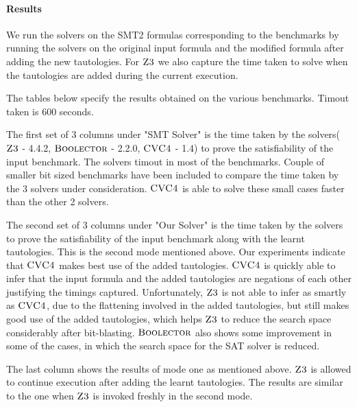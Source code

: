 \paragraph{\bf Results}
%
We run the solvers on the SMT2 formulas corresponding to the benchmarks by running the solvers on the original input formula and the modified formula after adding the new tautologies.
%
For $\textsc{Z3}$ we also capture the time taken to solve when the tautologies are added during the current execution.

The tables below specify the results obtained on the various benchmarks. Timout taken is 600 seconds.
%



The first set of 3 columns under "SMT Solver" is the time taken by the solvers($\textsc{Z3}$ - 4.4.2, $\textsc{Boolector}$ - 2.2.0, $\textsc{CVC4}$ - 1.4) to prove the satisfiability of the input benchmark. The solvers timout in most of the benchmarks. Couple of smaller bit sized benchmarks have been included to compare the time taken by the 3 solvers under consideration. $\textsc{CVC4}$ is able to solve these small cases faster than the other 2 solvers.

The second set of 3 columns under "Our Solver" is the time taken by the solvers to prove the satisfiability of the input benchmark along with the learnt tautologies. This is the second mode mentioned above.
%
Our experiments indicate that $\textsc{CVC4}$ makes best use of the added tautologies. $\textsc{CVC4}$ is quickly able to infer that the input formula and the added tautologies are negations of each other justifying the timings captured. Unfortunately, $\textsc{Z3}$ is not able to infer as smartly as $\textsc{CVC4}$, due to the flattening involved in the added tautologies, but still makes good use of the added tautologies, which helps $\textsc{Z3}$ to reduce the search space considerably after bit-blasting. $\textsc{Boolector}$ also shows some improvement in some of the cases, in which the search space for the SAT solver is reduced.




The last column shows the results of mode one as mentioned above. $\textsc{Z3}$ is allowed to continue execution after adding the learnt tautologies. The results are similar to the one when $\textsc{Z3}$ is invoked freshly in the second mode.




